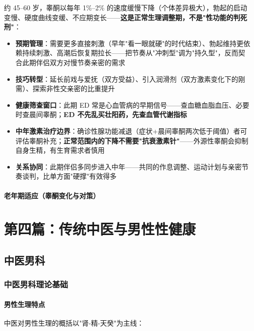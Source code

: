 约 45--60 岁，睾酮以每年 1\%--2\% 的速度缓慢下降（个体差异极大），勃起的启动变慢、硬度曲线变缓、不应期变长——\textbf{这是正常生理调整期，不是"性功能的判死刑"}：

\begin{itemize}
	\item \textbf{预期管理}：需要更多直接刺激（早年"看一眼就硬"的时代结束）、勃起维持更依赖持续刺激、高潮后恢复期拉长——把节奏从"冲刺型"调为"持久型"，反而契合此期伴侣双方对慢节奏亲密的需求
	\item \textbf{技巧转型}：延长前戏与爱抚（双方受益）、引入润滑剂（双方激素变化下的刚需）、探索非性交亲密的比重提升
	\item \textbf{健康筛查窗口}：此期 ED 常是心血管病的早期信号——查血糖血脂血压、必要时查晨间睾酮；\textbf{ED 不先乱买壮阳药，先查血管代谢指标}
	\item \textbf{中年激素治疗边界}：确诊性腺功能减退（症状+晨间睾酮两次低于阈值）者可评估睾酮补充；\textbf{正常范围内的下降不需要"抗衰激素针"}——外源性睾酮会抑制自身生精，有生育需求者慎用
	\item \textbf{关系协同}：此期伴侣多同步进入中年——共同的作息调整、运动计划与亲密节奏谈判，比单方面"硬撑"有效得多
\end{itemize}

\subsection{老年期适应（睾酮变化与对策）}

\part{第四篇：传统中医与男性性健康}

\chapter{中医男科}

\section{中医男科理论基础}
\subsection{男性生理特点}


中医对男性生理的概括以"肾-精-天癸"为主线：

